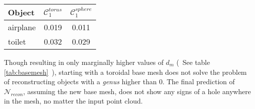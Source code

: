 \begin{center}
     \label{tab:basemesh} 
    \begin{center}
        \begin{tabular}{| l  | c | c |}
            \hline
            Object& $\mathcal{C}_1^{torus}$ & $\mathcal{C}_1^{sphere}$ \\ \hline
            airplane&0.019&0.011\\\hline
            toilet&0.032&0.029\\\hline
        \end{tabular}
    \end{center}
\end{center}
    Though resulting in only marginally higher values of $d_m$ (~See table \ref{tab:basemesh}~), starting with a toroidal base mesh does not solve the problem 
    of reconstructing objects with a \emph{genus} higher than 0. The final prediction of $\mathcal{N}_{recon}$, assuming the 
    new base mesh, does not show any signs of a hole anywhere in the mesh, no matter the input point cloud. 

